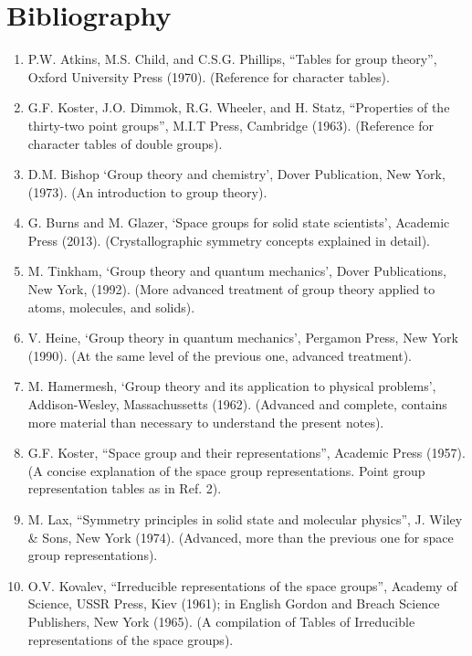 \documentclass[12pt,a4paper]{article}
\begin{document}
\section{\color{coral}Bibliography}
\begin{enumerate}

\item
P.W. Atkins, M.S. Child, and C.S.G. Phillips, ``Tables for group theory'',
Oxford University Press (1970). (Reference for character tables).

\item
G.F. Koster, J.O. Dimmok, R.G. Wheeler, and H. Statz, ``Properties
of the thirty-two point groups'', M.I.T Press, Cambridge (1963). 
(Reference for character tables of double groups).

\item
D.M. Bishop `Group theory and chemistry', Dover Publication, New York, (1973).
(An introduction to group theory).

\item
G. Burns and M. Glazer, `Space groups for solid state scientists', Academic Press
(2013). (Crystallographic symmetry concepts explained in detail). 

\item
M. Tinkham, `Group theory and quantum mechanics', Dover Publications, New York,
(1992). (More advanced treatment of group theory applied to atoms, molecules,
and solids).

\item
V. Heine, `Group theory in quantum mechanics', Pergamon Press, New York (1990).
(At the same level of the previous one, advanced treatment).

\item
M. Hamermesh, `Group theory and its application to physical problems',
Addison-Wesley, Massachussetts (1962). 
(Advanced and complete, contains more material than necessary to
understand the present notes).

\item
G.F. Koster, ``Space group and their representations'', Academic Press (1957).
(A concise explanation of the space group representations. Point
group representation tables as in Ref. 2).

\item
M. Lax, ``Symmetry principles in solid state and molecular physics'',
J. Wiley \& Sons, New York (1974).
(Advanced, more than the previous one for space group representations).

\item
O.V. Kovalev, ``Irreducible representations of the space groups'',
Academy of Science, USSR Press, Kiev (1961); in English
Gordon and Breach Science Publishers, New York (1965).
(A compilation of Tables of Irreducible representations of the space groups).


\end{enumerate}
\end{document}
